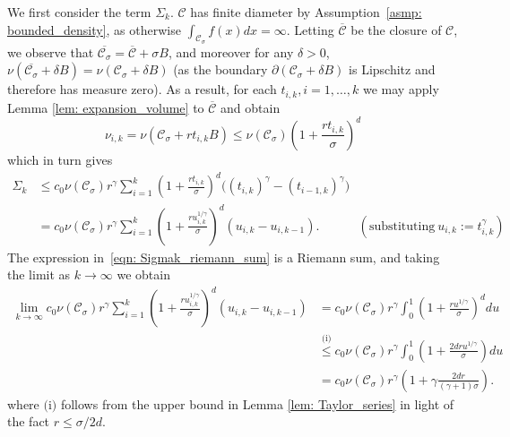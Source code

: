 \documentclass[11pt,twoside]{article}
\newcommand{\1}{\mathbf{1}}
\newcommand{\Cset}{\mathcal{C}}
\newcommand{\Csig}{\Cset_{\sigma}}
\begin{document}
	We first consider the term $\Sigma_k$. $\Cset$ has finite diameter by Assumption~\ref{asmp: bounded_density}, as otherwise $\int_{\Csig} f(x) dx = \infty$. Letting $\overline{\Cset}$ be the closure of $\Cset$, we observe that $\overline{\Csig} = \overline{\Cset} + \sigma B$, and moreover for any $\delta > 0$, $\nu(\overline{\Csig} + \delta B) = \nu(\Csig + \delta B)$ (as the boundary $\partial(\Csig + \delta B)$ is Lipschitz and therefore has measure zero). As a result, for each $t_{i,k}, i = 1, \ldots,k$ we may apply Lemma \ref{lem: expansion_volume} to $\overline{\Cset}$ and obtain
	\begin{equation}
	\label{eqn: slice_volume_bound}
	\nu_{i,k} = \nu(\Csig + rt_{i,k}B) \leq \nu(\Csig)\left(1 + \frac{rt_{i,k}}{\sigma}\right)^d
	\end{equation}
	which in turn gives
	\begin{align}
	\Sigma_k & \leq c_0\nu(\Csig) r^\gamma \sum_{i = 1}^{k} \left(1 + \frac{ rt_{i,k}}{\sigma}\right)^d \biggl( (t_{i,k})^{\gamma} - (t_{i-1,k})^{\gamma}\biggr) \nonumber \\
	& = c_0\nu(\Csig) r^\gamma \sum_{i = 1}^{k} \left(1 + \frac{ru_{i,k}^{1/\gamma}}{\sigma}\right)^d ( u_{i,k} - u_{i,k-1}).~~~~~~~~~~~~~~ (\text{substituting}~u_{i,k} := t_{i,k}^{\gamma}) \label{eqn: Sigmak_riemann_sum}
	\end{align}
	The expression in~\eqref{eqn: Sigmak_riemann_sum} is a Riemann sum, and taking the limit as $k \to \infty$ we obtain
	\begin{align}
	\lim_{k \to \infty} c_0\nu(\Csig) r^\gamma \sum_{i = 1}^{k} \left(1 + \frac{ru_{i,k}^{1/\gamma}}{\sigma}\right)^d ( u_{i,k} - u_{i,k-1}) & = c_0\nu(\Csig) r^\gamma \int_{0}^{1} \left(1 + \frac{r u^{1/\gamma}}{\sigma}\right)^{d} du \nonumber \\
	& \overset{\text{(i)}}{\leq} c_0\nu(\Csig) r^\gamma \int_{0}^{1} \left(1 + \frac{2 d r u^{1/\gamma}}{\sigma}\right) du \nonumber \\
	& = c_0\nu(\Csig) r^\gamma \left(1 + \gamma \frac{2 d r}{(\gamma + 1)\sigma}\right). \label{eqn: Sigmak_integral}
	\end{align}
	where $\text{(i)}$ follows from the upper bound in Lemma \ref{lem: Taylor_series} in light of the fact $r \leq \sigma / 2d$. 
	
\end{document}
